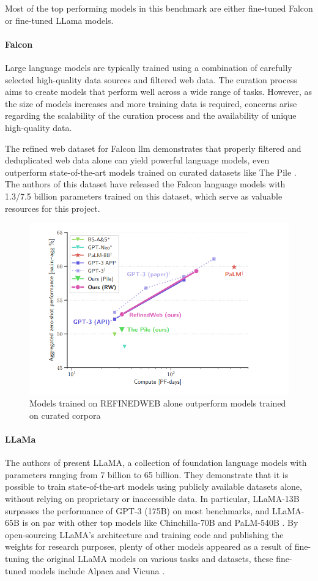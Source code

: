 \documentclass[a4paper,12pt]{article}
\begin{document}
Most of the top performing models in this benchmark are either fine-tuned Falcon \cite{falcon} or fine-tuned LLama \cite{llama} models.

\paragraph*{Falcon}
Large language models are typically trained using a combination of carefully selected high-quality data sources and filtered web data. 
The curation process aims to create models that perform well across a wide range of tasks. 
However, as the size of models increases and more training data is required, concerns arise regarding the scalability of the curation process and the availability of unique high-quality data.

The refined web dataset for Falcon llm \cite{falcondataset} demonstrates that properly filtered and deduplicated web data alone can yield powerful language models, 
even outperform state-of-the-art models trained on curated datasets like The Pile \cite{pile}. 
The authors of this dataset\cite{falcondataset} have released the Falcon \cite{falcon} language models with 1.3/7.5 billion parameters trained on this dataset, 
which serve as valuable resources for this project.

\begin{figure}[htbp]
	\centering
	\includegraphics[width=.5\linewidth]{figures/falcon.png}
	\caption{Models trained on REFINEDWEB \cite{falcondataset} alone outperform models trained on curated corpora}
	\label{fig:falcon}
\end{figure}

\paragraph*{LLaMa}
The authors of \cite{llama} present LLaMA, a collection of foundation language models with parameters ranging from 7 billion to 65 billion. 
They demonstrate that it is possible to train state-of-the-art models using publicly available datasets alone, without relying on proprietary or inaccessible data. 
In particular, LLaMA-13B surpasses the performance of GPT-3 (175B) \cite{gpt3} on most benchmarks, and LLaMA-65B is on par with other top models like Chinchilla-70B \cite{chinchilla} and PaLM-540B \cite{palm}. 
By open-sourcing LLaMA's architecture and training code and publishing the weights for research purposes, plenty of other models appeared as a result of fine-tuning the original LLaMA models on various tasks and datasets, 
these fine-tuned models include Alpaca \cite{alpaca} and Vicuna \cite{vicuna}.     
\end{document}
